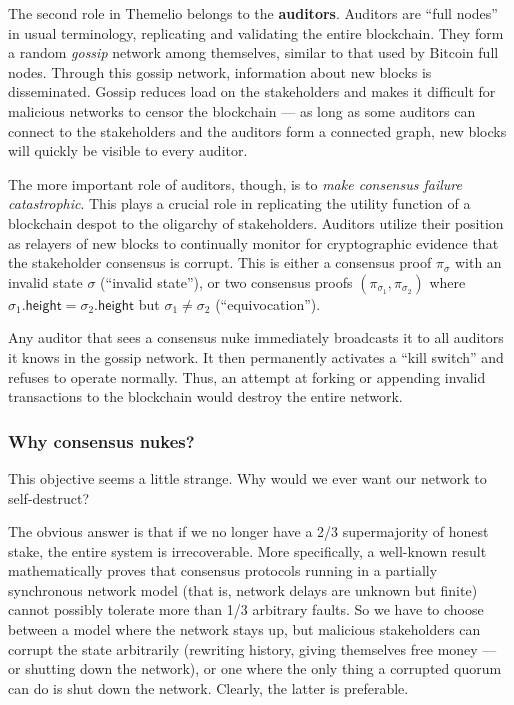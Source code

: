 \documentclass[letterpaper,12pt,oneside]{article}
\begin{document}
The second role in Themelio belongs to the \textbf{auditors}. Auditors are ``full nodes'' in usual terminology, replicating and validating the entire blockchain. They form a random \emph{gossip} network among themselves, similar to that used by Bitcoin full nodes. Through this gossip network, information about new blocks is disseminated. Gossip reduces load on the stakeholders and makes it difficult for malicious networks to censor the blockchain --- as long as some auditors can connect to the stakeholders and the auditors form a connected graph, new blocks will quickly be visible to every auditor.

The more important role of auditors, though, is to \textit{make consensus failure catastrophic}. This plays a crucial role in replicating the utility function of a blockchain despot to the oligarchy of stakeholders. Auditors utilize their position as relayers of new blocks to continually monitor for cryptographic evidence that the stakeholder consensus is corrupt. This is either a consensus proof $\pi_\sigma$ with an invalid state $\sigma$ (``invalid state''), or two consensus proofs $(\pi_{\sigma_1},\pi_{\sigma_2})$ where $\sigma_1.\mathsf{height} = \sigma_2.\mathsf{height}$ but $\sigma_1 \neq \sigma_2$ (``equivocation'').

Any auditor that sees a consensus nuke immediately broadcasts it to all auditors it knows in the gossip network. It then permanently activates a ``kill switch'' and refuses to operate normally. Thus, an attempt at forking or appending invalid transactions to the blockchain would destroy the entire network.

\subsubsection{Why consensus nukes?}

This objective seems a little strange. Why would we ever want our network to self-destruct?

The obvious answer is that if we no longer have a 2/3 supermajority of honest stake, the entire system is irrecoverable. More specifically, a well-known result \cite{dwork1988consensus} mathematically proves that consensus protocols running in a partially synchronous network model (that is, network delays are unknown but finite) cannot possibly tolerate more than 1/3 arbitrary faults. So we have to choose between a model where the network stays up, but malicious stakeholders can corrupt the state arbitrarily (rewriting history, giving themselves free money --- or shutting down the network), or one where the only thing a corrupted quorum can do is shut down the network. Clearly, the latter is preferable.
\end{document}
